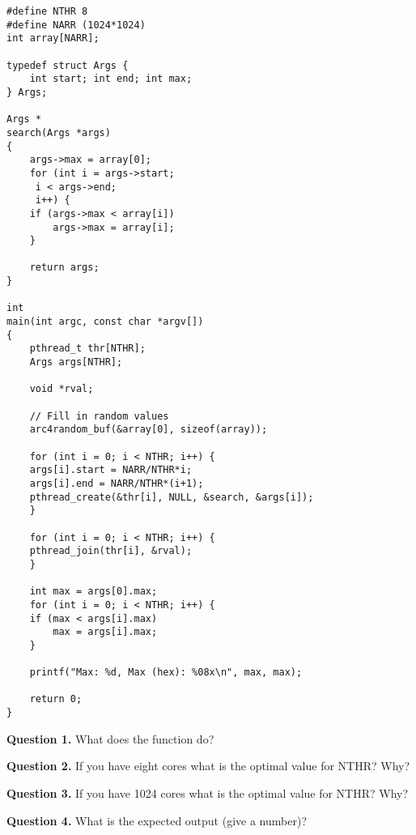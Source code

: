 \documentclass[letterpaper,twocolumn,10pt]{article}
\begin{document}
\pagestyle{fancy}
\fancyfoot[C]{\thepage}

\begin{lstlisting}[style=CStyle]
#define NTHR 8
#define NARR (1024*1024)
int array[NARR];

typedef struct Args {
    int start; int end; int max;
} Args;

Args *
search(Args *args)
{
    args->max = array[0];
    for (int i = args->start;
	 i < args->end;
	 i++) {
	if (args->max < array[i])
	    args->max = array[i];
    }

    return args;
}

int
main(int argc, const char *argv[])
{
    pthread_t thr[NTHR];
    Args args[NTHR];
    
    void *rval;

    // Fill in random values
    arc4random_buf(&array[0], sizeof(array));

    for (int i = 0; i < NTHR; i++) {
	args[i].start = NARR/NTHR*i;
	args[i].end = NARR/NTHR*(i+1);
	pthread_create(&thr[i], NULL, &search, &args[i]);
    }

    for (int i = 0; i < NTHR; i++) {
	pthread_join(thr[i], &rval);
    }

    int max = args[0].max;
    for (int i = 0; i < NTHR; i++) {
	if (max < args[i].max)
	    max = args[i].max;
    }

    printf("Max: %d, Max (hex): %08x\n", max, max);

    return 0;
}
\end{lstlisting}

\break

\noindent
\textbf{Question 1.} What does the function do?

\vspace{12em}

\noindent
\textbf{Question 2.} If you have eight cores what is the optimal value for 
NTHR? Why?

\vspace{12em}

\noindent
\textbf{Question 3.} If you have 1024 cores what is the optimal value for NTHR?  
Why?

\vspace{12em}
\noindent
\textbf{Question 4.} What is the expected output (give a number)?

\vspace{12em}
\end{document}
